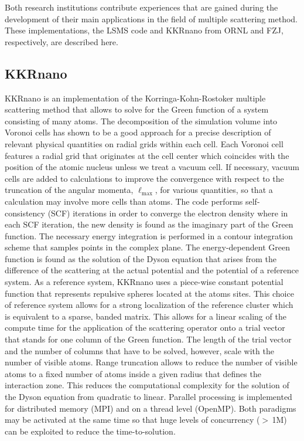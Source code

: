 \documentclass{llncs}
\newcommand{\ellmax}{\ell_{\mathrm{max}}}
\def\KKRnano{{KKRnano}}
\def\LSMS{{LSMS}}
\begin{document}
Both research institutions contribute experiences that are gained during the development
of their main applications in the field of multiple scattering method.
These implementations, the \LSMS{} code and \KKRnano{} from ORNL and FZJ, respectively, are described here.

\subsection{KKRnano} \label{section:kkrnano}
\KKRnano{} is an implementation of the Korringa-Kohn-Rostoker multiple scattering method \cite{PhysRevB.52.8807,PhysRevB.85.235103}
that allows to solve for the Green function of a system consisting of many atoms.
The decomposition of the simulation volume into Voronoi cells has shown to be a good
approach for a precise description of relevant physical quantities on radial grids within each cell.
Each Voronoi cell features a radial grid that originates at the cell center
which coincides with the position of the atomic nucleus unless we treat a vacuum cell.
If necessary, vacuum cells are added to calculations to improve the convergence with respect to the truncation of
the angular momenta, $\ellmax$, for various quantities, so that a calculation may involve more cells than atoms.
The code performs self-consistency (SCF) iterations in order to converge the electron density
where in each SCF iteration, the new density is found as the imaginary part of the Green function.
The necessary energy integration is performed in a contour integration scheme that
samples points in the complex plane.
The energy-dependent Green function is found as the solution of the Dyson equation
that arises from the difference of the scattering at the actual potential and the potential 
of a reference system. As a reference system, \KKRnano{} uses a piece-wise constant potential
function that represents repulsive spheres located at the atoms sites.
This choice of reference system allows for a strong localization of the reference cluster
which is equivalent to a sparse, banded matrix. 
This allows for a linear scaling of the compute time for the application of the scattering operator
onto a trial vector that stands for one column of the Green function. 
The length of the trial vector and the number of columns that have to be solved, however, scale with
the number of visible atoms.
Range truncation allows to reduce the number of visible atoms to a fixed number 
of atoms inside a given radius that defines the interaction zone. This reduces the computational
complexity for the solution of the Dyson equation from quadratic to linear.
Parallel processing is implemented for distributed memory (MPI) and on a thread level (OpenMP).
Both paradigms may be activated at the same time so that huge levels of concurrency 
($> \,$1M) can be exploited to reduce the time-to-solution.
\end{document}
